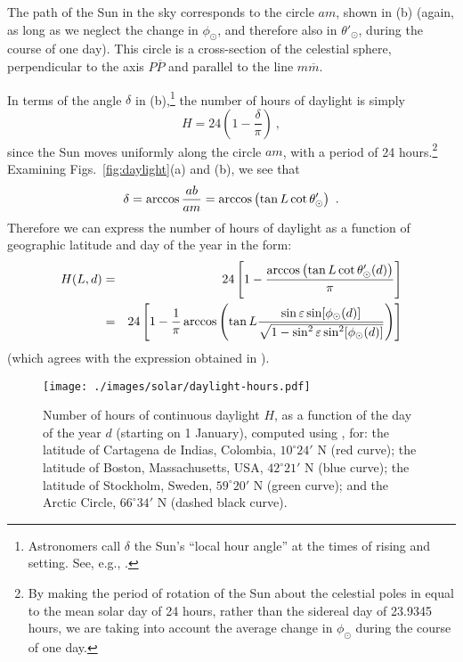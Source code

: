 The path of the Sun in the sky corresponds to the circle $am$, shown in (b) (again, as long as we neglect the change in $\phi_\odot$, and therefore also in $\theta'_\odot$, during the course of one day).  This circle is a cross-section of the celestial sphere, perpendicular to the axis $P \overline P$ and parallel to the line $m \overline m$.

In terms of the angle $\delta$ in (b),\footnote{Astronomers call $\delta$ the Sun's ``local hour angle'' at the times of rising and setting.  See, e.g., \cite{Meeus-rising}.} the number of hours of daylight is simply
\begin{equation}
H = 24 \left( 1 - \frac{\delta}{\pi} \right)~,
\end{equation}
since the Sun moves uniformly along the circle $am$, with a period of 24 hours.\footnote{By making the period of rotation of the Sun about the celestial poles in  equal to the mean solar day of 24 hours, rather than the sidereal day of 23.9345 hours, we are taking into account the average change in $\phi_\odot$ during the course of one day.}  Examining Figs.~\ref{fig:daylight}(a) and (b), we see that
\begin{equation}
\delta = \arccos \frac{ab}{am} = \arccos \left( \tan L \cot \theta'_\odot \right)~.
\la{eq:delta}
\end{equation}
Therefore we can express the number of hours of daylight as a function of geographic latitude and day of the year in the form:
\begin{eqnarray}
H(L,d) &=& 24 \left[ 1 - \frac{\arccos \left( \tan L \cot \theta'_\odot (d) \right)}{\pi} \right] \nn
&=& 24 \left[ 1 - \frac{1}{\pi} \arccos \left( \tan L \frac{\sin \varepsilon \sin [\phi_\odot (d)]}
{\sqrt{1 - \sin^2 \varepsilon \sin^2 [\phi_\odot (d)]}} \right) \right]
\la{eq:hours}
\end{eqnarray}
(which agrees with the expression obtained in \cite{Khavrus}).

\begin{figure} [t]
\begin{center}
	\texttt{[image: ./images/solar/daylight-hours.pdf]}
\end{center}
\caption{\small Number of hours of continuous daylight $H$, as a function of the day of the year $d$ (starting on 1 January), computed using , for: the latitude of Cartagena de Indias, Colombia, $10^\circ 24'$ N (red curve); the latitude of Boston, Massachusetts, USA, $42^\circ 21'$ N (blue curve); the latitude of Stockholm, Sweden, $59^\circ 20'$ N (green curve); and the Arctic Circle, $66^\circ 34'$ N (dashed black curve).}
\end{figure}

